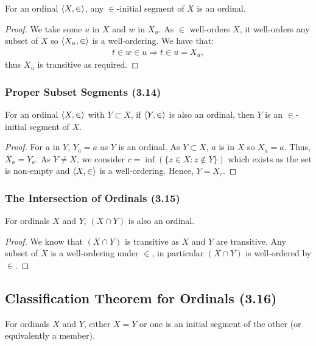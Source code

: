 For an ordinal ${\langle X, \in \rangle}$, any $\in$-initial segment of $X$ is an ordinal.

\begin{proof}
    We take some $u$ in $X$ and $w$ in $X_u$. 
    As $\in$ well-orders $X$, it well-orders
    any subset of $X$ so ${\langle X_u, \in \rangle}$ is a well-ordering. 
    We have that: \begin{align*}
        t \in w \in u \Longrightarrow t \in u = X_u,
    \end{align*} thus $X_u$ is transitive as required.
\end{proof}

\subsubsection{Proper Subset Segments (3.14)} \label{3.14}

For an ordinal ${\langle X, \in \rangle}$ with $Y \subset X$, if ${\langle Y, \in \rangle}$
is also an ordinal, then $Y$ is an $\in$-initial segment of $X$.

\begin{proof}
    For $a$ in $Y$, $Y_a = a$ as $Y$ is an ordinal.
    As $Y \subset X$, $a$ is in $X$ so $X_a = a$. Thus, $X_a = Y_a$.
    As $Y \neq X$, we consider $c = \inf(\{z \in X : z \notin Y\})$ which 
    exists as the set is non-empty and ${\langle X, \in \rangle}$ is a well-ordering. 
    Hence, $Y = X_c$.
\end{proof}

\subsubsection{The Intersection of Ordinals (3.15)} \label{3.15}

For ordinals $X$ and $Y$, $(X \cap Y)$ is also an ordinal.

\begin{proof}
    We know that $(X \cap Y)$ is transitive as $X$ and $Y$
    are transitive. Any subset of $X$ is a well-ordering
    under $\in$, in particular $(X \cap Y)$
    is well-ordered by $\in$. 
\end{proof}

\subsection{Classification Theorem for Ordinals (3.16)} \label{3.16}

For ordinals $X$ and $Y$, either $X = Y$ or one is an initial
segment of the other (or equivalently a member).

